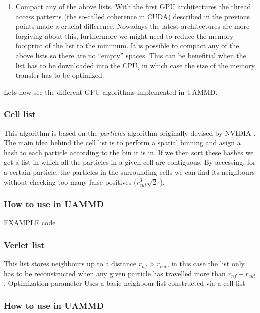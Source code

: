 \documentclass[ twoside,openright,titlepage,numbers=noenddot,%
headinclude,footinclude,cleardoublepage=empty,abstract=on,
BCOR=5mm,paper=a4,fontsize=11pt, dvipsnames
]{scrreprt}
\newcommand{\uammd}{\gls{UAMMD}\xspace}
\newcommand{\gpu}{\gls{GPU}\xspace}
\begin{document}
\begin{enumerate}
\item Compact any of the above lists.
  With the first \gpu architectures the thread access patterns (the so-called coherence in CUDA) described in the previous points made a crucial difference. Nowadays the latest architectures are more forgiving about this, furthermore we might need to reduce the memory footprint of the list to the minimum. It is possible to compact any of the above lists so there are no ``empty'' spaces. This can be benefitial when the list has to be downloaded into the CPU, in which case the size of the memory transfer has to be optimized.
\end{enumerate}

Lets now see the different \gpu algorithms implemented in \uammd.

\subsubsection{Cell list}

This algorithm is based on the \emph{particles} algorithm originally devised by NVIDIA \cite{gpugems3}.
The main idea behind the cell list is to perform a spatial binning and asign a hash to each particle according to the bin it is in. If we then sort these hashes we get a list in which all the particles in a given cell are contiguous. By accessing, for a certain particle, the particles in the surrounding cells we can find its neighbours without checking too many false positives ($r_{cut}^3\sqrt{2}$ ).

\subsubsection{How to use in UAMMD}

EXAMPLE code


\subsubsection{Verlet list}

This list stores neighbours up to a distance $r_{nf} > r_{cut}$, in this case the list only has to be reconstructed when any given particle has travelled more than $r_{nf}-r_{cut}$.
Optimization parameter
Uses a basic neighbour list constructed via a cell list 


\subsubsection{How to use in UAMMD}
\end{document}
